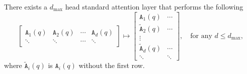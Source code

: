 \begin{corollary}\label{cor:second-step-enc}
    There exists a $d_{\max}$ head standard attention layer that performs the following
    \[
        \begin{bmatrix}
            \mathtt{A}_1(q) & \mathtt{A}_2(q) & \cdots & \mathtt{A}_d(q)
            \\
            \ddots & \ddots & \cdots & \ddots 
        \end{bmatrix}
        \mapsto
        \begin{bmatrix}
            \mathtt{A}_1(q) & \cdots 
            \\
            \tilde{\mathtt{A}}_2(q) & \cdots
            \\
            \vdots
            \\
            \tilde{\mathtt{A}}_d(q) & \cdots
            \\
            \ddots & \ddots 
        \end{bmatrix},
        \quad\text{for any }d \leq d_{\max},
    \]
    where $\tilde{\mathtt{A}}_i(q)$ is $\mathtt{A}_i(q)$ without the first row.
\end{corollary}
